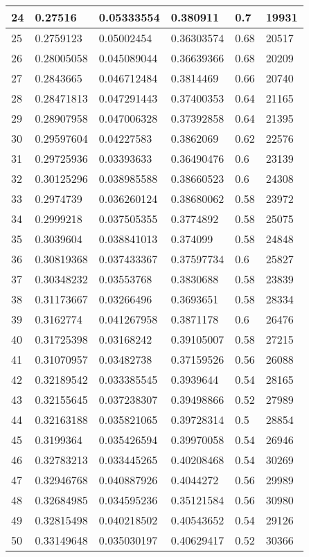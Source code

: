 \begin{longtable}{|l|l|l|l|l|l|}
24 & 0.27516 & 0.05333554 & 0.380911 & 0.7 & 19931 \\ \hline 
25 & 0.2759123 & 0.05002454 & 0.36303574 & 0.68 & 20517 \\ \hline 
26 & 0.28005058 & 0.045089044 & 0.36639366 & 0.68 & 20209 \\ \hline 
27 & 0.2843665 & 0.046712484 & 0.3814469 & 0.66 & 20740 \\ \hline 
28 & 0.28471813 & 0.047291443 & 0.37400353 & 0.64 & 21165 \\ \hline 
29 & 0.28907958 & 0.047006328 & 0.37392858 & 0.64 & 21395 \\ \hline 
30 & 0.29597604 & 0.04227583 & 0.3862069 & 0.62 & 22576 \\ \hline 
31 & 0.29725936 & 0.03393633 & 0.36490476 & 0.6 & 23139 \\ \hline 
32 & 0.30125296 & 0.038985588 & 0.38660523 & 0.6 & 24308 \\ \hline 
33 & 0.2974739 & 0.036260124 & 0.38680062 & 0.58 & 23972 \\ \hline 
34 & 0.2999218 & 0.037505355 & 0.3774892 & 0.58 & 25075 \\ \hline 
35 & 0.3039604 & 0.038841013 & 0.374099 & 0.58 & 24848 \\ \hline 
36 & 0.30819368 & 0.037433367 & 0.37597734 & 0.6 & 25827 \\ \hline 
37 & 0.30348232 & 0.03553768 & 0.3830688 & 0.58 & 23839 \\ \hline 
38 & 0.31173667 & 0.03266496 & 0.3693651 & 0.58 & 28334 \\ \hline 
39 & 0.3162774 & 0.041267958 & 0.3871178 & 0.6 & 26476 \\ \hline 
40 & 0.31725398 & 0.03168242 & 0.39105007 & 0.58 & 27215 \\ \hline 
41 & 0.31070957 & 0.03482738 & 0.37159526 & 0.56 & 26088 \\ \hline 
42 & 0.32189542 & 0.033385545 & 0.3939644 & 0.54 & 28165 \\ \hline 
43 & 0.32155645 & 0.037238307 & 0.39498866 & 0.52 & 27989 \\ \hline 
44 & 0.32163188 & 0.035821065 & 0.39728314 & 0.5 & 28854 \\ \hline 
45 & 0.3199364 & 0.035426594 & 0.39970058 & 0.54 & 26946 \\ \hline 
46 & 0.32783213 & 0.033445265 & 0.40208468 & 0.54 & 30269 \\ \hline 
47 & 0.32946768 & 0.040887926 & 0.4044272 & 0.56 & 29989 \\ \hline 
48 & 0.32684985 & 0.034595236 & 0.35121584 & 0.56 & 30980 \\ \hline 
49 & 0.32815498 & 0.040218502 & 0.40543652 & 0.54 & 29126 \\ \hline 
50 & 0.33149648 & 0.035030197 & 0.40629417 & 0.52 & 30366 \\ \hline 
\end{longtable}